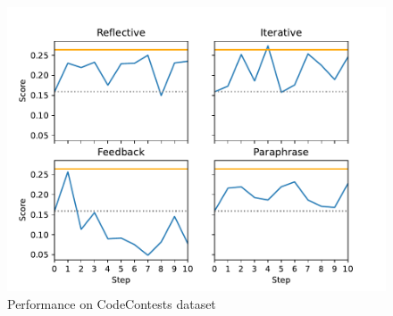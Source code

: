 \begin{figure}
    \label{fig:codecontests}
    \includegraphics[width=\linewidth]{codecontests.pdf}
    \caption{Performance on CodeContests dataset}
\end{figure}
